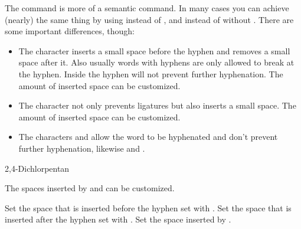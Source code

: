 \documentclass[load-preamble+]{cnltx-doc}
\begin{document}
\begin{example}
  \begin{minipage}{.4\linewidth}
  \end{minipage}
\end{example}

The  command is more of a semantic command.  In many cases you can
achieve (nearly) the same thing by using \cs*{-} instead of \sym{\textbar},
and  instead of \sym{\textasciicircum} without
.  There are some important differences, though:
\begin{itemize}
  \item The character \sym{-} inserts a small space before the hyphen and
    removes a small space after it.  Also usually words with hyphens are only
    allowed to break at the hyphen.  Inside  the hyphen will not
    prevent further hyphenation.  The amount of inserted space can be
    customized.
  \item The character \sym{\textbar} not only prevents ligatures but also
    inserts a small space.  The amount of inserted space can be customized.
  \item The characters \sym{(} and \sym{)} allow the word to be hyphenated and
    don't prevent further hyphenation, likewise \sym{[} and \sym{]}.
\end{itemize}
\begin{example}
  \huge{} \par
  2,4-Dichlorpentan
\end{example}

The spaces inserted by \sym{-} and \sym{\textbar} can be customized.
\begin{options}
  \Default{.01em}
    Set the space that is inserted before the hyphen set with \sym{-}.
  \Default{-.03em}
    Set the space that is inserted after the hyphen set with \sym{-}.
  \Default{.01em}
    Set the space inserted by \sym{\textbar}.
\end{options}
\end{document}

